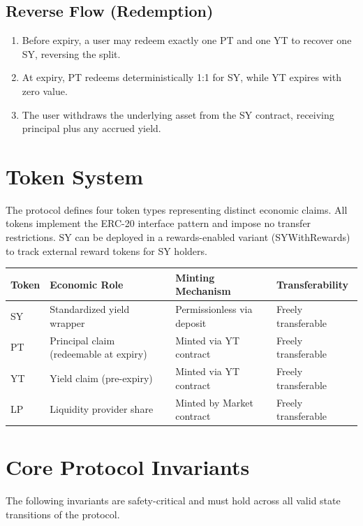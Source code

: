 \subsection{Reverse Flow (Redemption)}

\begin{enumerate}
    \item Before expiry, a user may redeem exactly one PT and one YT to recover one SY, reversing the split.
    \item At expiry, PT redeems deterministically 1:1 for SY, while YT expires with zero value.
    \item The user withdraws the underlying asset from the SY contract, receiving principal plus any accrued yield.
\end{enumerate}

\section{Token System}

The protocol defines four token types representing distinct economic claims. All tokens implement the ERC-20 interface pattern and impose no transfer restrictions.
SY can be deployed in a rewards-enabled variant (SYWithRewards) to track external reward tokens for SY holders.

\begin{center}
\begin{tabularx}{\textwidth}{l >{\raggedright\arraybackslash}X l l}
\toprule
\textbf{Token} & \textbf{Economic Role} & \textbf{Minting Mechanism} & \textbf{Transferability} \\
\midrule
SY & Standardized yield wrapper & Permissionless via deposit & Freely transferable \\
PT & Principal claim (redeemable at expiry) & Minted via YT contract & Freely transferable \\
YT & Yield claim (pre-expiry) & Minted via YT contract & Freely transferable \\
LP & Liquidity provider share & Minted by Market contract & Freely transferable \\
\bottomrule
\end{tabularx}
\end{center}

\section{Core Protocol Invariants}

The following invariants are safety-critical and must hold across all valid state transitions of the protocol.

